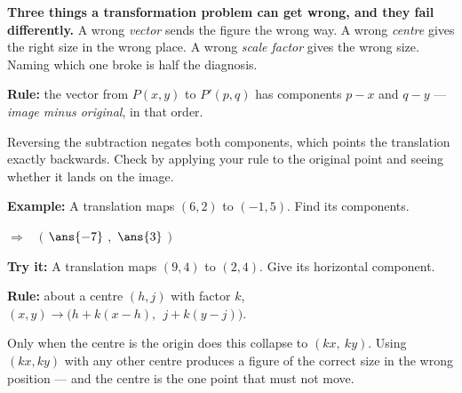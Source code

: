 \documentclass[12pt]{article}
\begin{document}

\begin{formulabox}
\textbf{Three things a transformation problem can get wrong, and they fail differently.} A wrong \emph{vector} sends the figure the wrong way. A wrong \emph{centre} gives the right size in the wrong place. A wrong \emph{scale factor} gives the wrong size. Naming which one broke is half the diagnosis.
\end{formulabox}


\begin{formulabox}
\textbf{Rule:} the vector from $P(x, y)$ to $P'(p, q)$ has components $p - x$ and $q - y$ --- \emph{image minus original}, in that order.\par
Reversing the subtraction negates both components, which points the translation exactly backwards. Check by applying your rule to the original point and seeing whether it lands on the image.
\end{formulabox}

\begin{examplebox}
\textbf{Example:} \quad A translation maps $(6, 2)$ to $(-1, 5)$. Find its components.

$\Rightarrow\quad ($ $\ans{-7}$ $,$ $\ans{3}$ $)$
\end{examplebox}

\begin{tryitbox}
\textbf{Try it:} \quad A translation maps $(9, 4)$ to $(2, 4)$. Give its horizontal component.\\[2pt]
\end{tryitbox}


\begin{formulabox}
\textbf{Rule:} about a centre $(h, j)$ with factor $k$, \ $(x, y) \to \bigl(h + k(x - h),\ \ j + k(y - j)\bigr)$.\par
Only when the centre is the origin does this collapse to $(kx,\ ky)$. Using $(kx, ky)$ with any other centre produces a figure of the correct size in the wrong position --- and the centre is the one point that must not move.
\end{formulabox}
\end{document}
